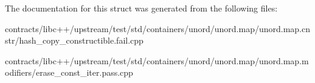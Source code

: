 The documentation for this struct was generated from the following files\+:\begin{DoxyCompactItemize}
\item 
contracts/libc++/upstream/test/std/containers/unord/unord.\+map/unord.\+map.\+cnstr/hash\+\_\+copy\+\_\+constructible.\+fail.\+cpp\item 
contracts/libc++/upstream/test/std/containers/unord/unord.\+map/unord.\+map.\+modifiers/erase\+\_\+const\+\_\+iter.\+pass.\+cpp\end{DoxyCompactItemize}
